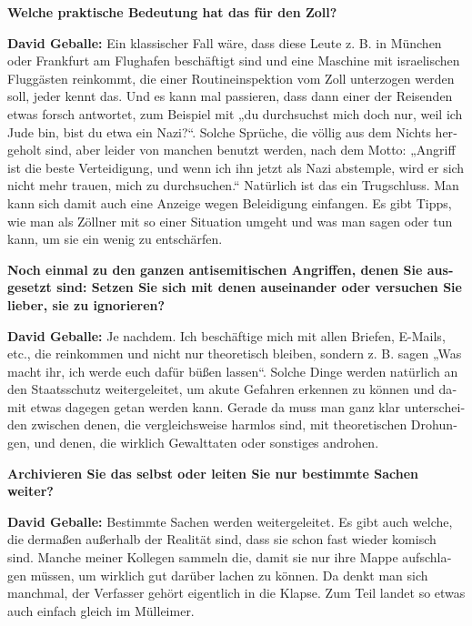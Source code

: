 \begin{otherlanguage}{ngerman}
\textbf{Welche praktische Bedeutung hat das für den Zoll?}

\textbf{David Geballe:} Ein klassischer Fall wäre, dass diese Leute z. B. in München oder Frankfurt am Flughafen beschäftigt sind und eine Maschine mit israelischen Fluggästen reinkommt, die einer Routineinspektion vom Zoll unterzogen werden soll, jeder kennt das. Und es kann mal passieren, dass dann einer der Reisenden etwas forsch antwortet, zum Beispiel mit „du durchsuchst mich doch nur, weil ich Jude bin, bist du etwa ein Nazi?“. Solche Sprüche, die völlig aus dem Nichts hergeholt sind, aber leider von manchen benutzt werden, nach dem Motto: „Angriff ist die beste Verteidigung, und wenn ich ihn jetzt als Nazi abstemple, wird er sich nicht mehr trauen, mich zu durchsuchen.“ Natürlich ist das ein Trugschluss. Man kann sich damit auch eine Anzeige wegen Beleidigung einfangen. Es gibt Tipps, wie man als Zöllner mit so einer Situation umgeht und was man sagen oder tun kann, um sie ein wenig zu entschärfen. 

\textbf{Noch einmal zu den ganzen antisemitischen Angriffen, denen Sie ausgesetzt sind: Setzen Sie sich mit denen auseinander oder versuchen Sie lieber, sie zu ignorieren?} 

\textbf{David Geballe:} Je nachdem. Ich beschäftige mich mit allen Briefen, E-Mails, etc., die reinkommen und nicht nur theoretisch bleiben, sondern z. B. sagen „Was macht ihr, ich werde euch dafür büßen lassen“. Solche Dinge werden natürlich an den Staatsschutz weitergeleitet, um akute Gefahren erkennen zu können und damit etwas dagegen getan werden kann. Gerade da muss man ganz klar unterscheiden zwischen denen, die vergleichsweise harmlos sind, mit theoretischen Drohungen, und denen, die wirklich Gewalttaten oder sonstiges androhen. 

\textbf{Archivieren Sie das selbst oder leiten Sie nur bestimmte Sachen weiter?} 

\textbf{David Geballe:} Bestimmte Sachen werden weitergeleitet. Es gibt auch welche, die dermaßen außerhalb der Realität sind, dass sie schon fast wieder komisch sind. Manche meiner Kollegen sammeln die, damit sie nur ihre Mappe aufschlagen müssen, um wirklich gut darüber lachen zu können. Da denkt man sich manchmal, der Verfasser gehört eigentlich in die Klapse. Zum Teil landet so etwas auch einfach gleich im Mülleimer. 


\end{otherlanguage}
